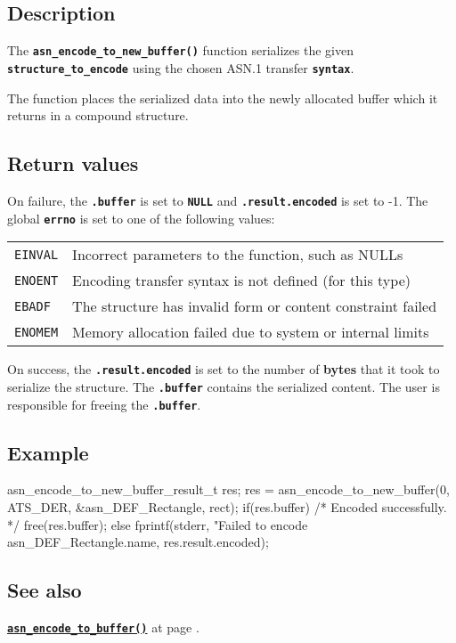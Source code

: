 \documentclass[english,oneside,12pt]{book}
\newcommand{\api}[2]{\hyperref[#1]{\code{#2}}}
\newcommand{\seealso}[2]{\api{#1}{#2} at page \pageref{#1}}
\newcommand{\code}[1]{\texttt{\textbf{\lstinline{#1}}}}
\begin{document}
\subsection*{Description}

The \code{asn_encode_to_new_buffer()} function serializes the given \code{structure_to_encode} using the chosen ASN.1 transfer \code{syntax}.

The function places the serialized data into the newly allocated buffer
which it returns in a compound structure.

\subsection*{Return values}

On failure, the \code{.buffer} is set to \code{NULL}
and \code{.result.encoded} is set to -1. The global \code{errno} is set
to one of the following values:

\begin{tabular}[h!]{ll}
\texttt{EINVAL} & Incorrect parameters to the function, such as NULLs \\
\texttt{ENOENT} & Encoding transfer syntax is not defined (for this type) \\
\texttt{EBADF} & The structure has invalid form or content constraint failed \\
\texttt{ENOMEM} & Memory allocation failed due to system or internal limits
\end{tabular}

\noindent{}On success, the \code{.result.encoded} is set to the number of
\textbf{bytes} that it took to serialize the structure.
The \code{.buffer} contains the serialized content.
The user is responsible for freeing the \code{.buffer}.

\subsection*{Example}
\begin{example}
asn_encode_to_new_buffer_result_t res;
res = asn_encode_to_new_buffer(0, ATS_DER, &asn_DEF_Rectangle, rect);
if(res.buffer) {
    /* Encoded successfully. */
    free(res.buffer);
} else {
    fprintf(stderr, "Failed to encode %
        asn_DEF_Rectangle.name, res.result.encoded);
}
\end{example}

\subsection*{See also}
\seealso{sec:asn_encode_to_buffer}{asn_encode_to_buffer()}.
\end{document}
